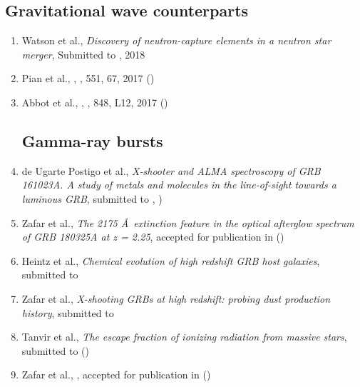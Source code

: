 \documentclass[12pt,letterpaper]{article}
\begin{document}
	\subsection*{\textbf{Gravitational wave counterparts}}
	\begin{enumerate}

\item Watson et al.,
	{\it Discovery of neutron-capture elements in a neutron star merger},
Submitted to \nature, 2018

\item Pian et al.,
	,
	\nature, 551, 67, 2017 ()

\item Abbot et al.,
	,
	\apjl, 848, L12, 2017 ()

\subsection*{Gamma-ray bursts}


\item de Ugarte Postigo et al.,
{\it X-shooter and ALMA spectroscopy of GRB 161023A.
	A study of metals and molecules in the line-of-sight towards a luminous GRB},
submitted to \aanda, )

\item Zafar et al.,
{\it The 2175 \AA~extinction feature in the optical afterglow spectrum of GRB 180325A at z = 2.25},
accepted for publication in \apjl ()

\item Heintz et al.,
	{\it Chemical evolution of high redshift GRB host galaxies},
	submitted to \aanda

\item Zafar et al.,
	{\it X-shooting GRBs at high redshift: probing dust production history},
	submitted to \mnras

\item Tanvir et al.,
	{\it The escape fraction of ionizing radiation from massive stars},
	submitted to \mnras ()

\item Zafar et al.,
	,
	accepted for publication in \mnras ()



\end{enumerate}
\end{document}
